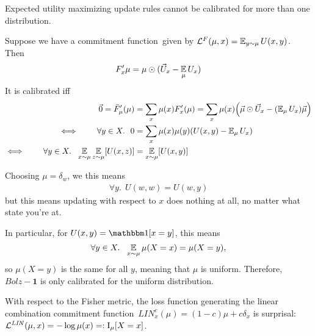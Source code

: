 \documentclass{article}
\def\cofunc{commitment function}
\begin{document}
\begin{prop}
	Expected utility maximizing update rules cannot be calibrated for more than one distribution.

\end{prop}
\begin{lproof}
	Suppose we have a \cofunc\ given by
	$\mathcal L^{F}(\mu, x) = \operatorname*{\mathbb{E}}_{y \sim \mu} U(x,y)$.
	Then
	\[ 
		F'_{x} \mu = \mu \odot (\vec U_x - \operatorname*{\mathbb{E}}_{\mu}{U_x})
	\] 
	It is calibrated iff 
	\begin{align*}
		\vec 0 =  \bar F'_\mu(\mu) 
			&= \sum_{x} \mu(x)  F'_{x} (\mu)
			= \sum_{x} \mu(x) \Big( \vec \mu \odot \vec U_x - (\operatorname*{\mathbb{E}}\nolimits_{\mu}{U_x}) \vec \mu \Big) \\
		\iff\qquad
		\forall y \in X.~~
			0 &= \sum_{x} \mu(x) \mu(y) ( U(x,y) - \operatorname*{\mathbb{E}}\nolimits_{\mu} U_x ) \\
		\iff\qquad
		\forall y \in X.~~
			\operatorname*{\mathbb{E}}_{x \sim \mu}\operatorname*{\mathbb{E}}_{z\sim \mu}[ U(x,z) ] &= \operatorname*{\mathbb{E}}_{x \sim \mu}[ U(x,y) ]
	\end{align*} 
    
    \begin{phaseout}
	Choosing $\mu = \delta_w$, we this means
	\begin{align*}
		\forall y.~~ U(w,w) = U(w,y)
	\end{align*}
	but this means updating with respect to $x$ does nothing at all, no matter what state you're at.
    \end{phaseout}
    
    In particular, for $U(x,y) = \mathbbm 1[x=y]$, this means 
    \[
        \forall y \in X.~~
        \operatorname*{\mathbb{E}}_{x \sim \mu}\mu(X=x) = \mu(X=y),
    \]
    so $\mu(X=y)$ is the same for all $y$, meaning that $\mu$ is uniform.
    Therefore, $\mathit{Bolz-}\mathbf{1}$ is only calibrated for the uniform distribution.
\end{lproof}


\begin{prop}
    With respect to the Fisher metric, the loss function generating the linear combination \cofunc\ 
    $
        \mathit{LIN}^c_{x}(\mu) = (1-c) \mu + c \delta_x
    $
    is surprisal:
    $
        \mathcal L^{\mathit{LIN}}(\mu, x) = - \log \mu(x) =: \operatorname{\mathrm{I}}_\mu[X=x]
    $.
\end{prop}
\end{document}

